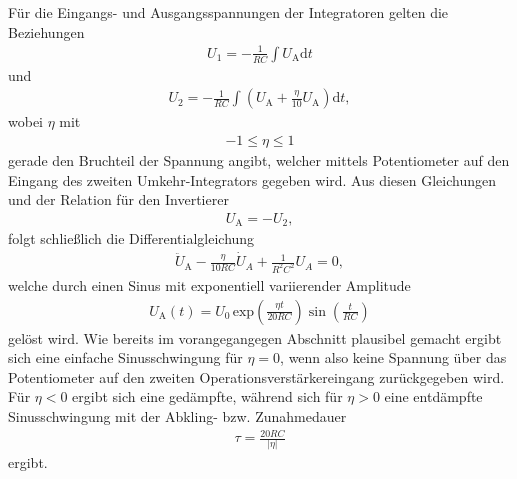 Für die Eingangs- und Ausgangsspannungen der Integratoren gelten die Beziehungen
\begin{align}
  U_1 = - \frac1{RC} \int U_\text{A} \mathrm{d}t
\end{align}
und
\begin{align}
  U_2 = - \frac1{RC} \int \left(U_\text{A} +\frac{\eta}{10} U_\text{A} \right) \mathrm{d}t,
\end{align}
wobei $\eta$ mit
\begin{align}
  -1 \leq \eta \leq 1
\end{align}
gerade den Bruchteil der Spannung angibt, welcher mittels Potentiometer auf den Eingang des
zweiten Umkehr-Integrators gegeben wird. Aus diesen Gleichungen und der Relation für den Invertierer
\begin{align}
  U_\text{A} = - U_2,
\end{align}
folgt schließlich die Differentialgleichung
\begin{align}
  \ddot{U}_\text{A} - \frac{\eta}{10 RC} \dot{U}_A + \frac1{R^2 C^2} U_A = 0,
\end{align}
welche durch einen Sinus mit exponentiell variierender Amplitude
\begin{align}
  U_\text{A}(t) = U_0 \, \text{exp} \left( \frac{\eta t}{20 RC} \right) \sin \left( \frac{t}{RC} \right)
\end{align}
gelöst wird. Wie bereits im vorangegangegen Abschnitt plausibel gemacht ergibt sich eine einfache
Sinusschwingung für $\eta = 0$, wenn also keine Spannung über das Potentiometer auf den zweiten
Operationsverstärkereingang zurückgegeben wird. Für $\eta < 0$ ergibt sich eine gedämpfte, während sich für
$\eta > 0$ eine entdämpfte Sinusschwingung mit der Abkling- bzw. Zunahmedauer
\begin{align}
  \tau = \frac{20 RC}{\lvert\eta\rvert}
\end{align}
ergibt.
